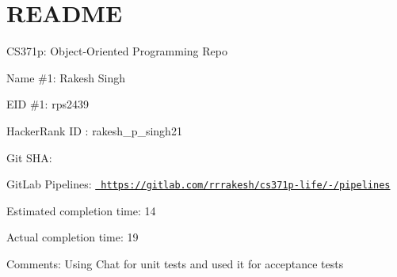 \chapter{README}
\hypertarget{md_README}{}\label{md_README}
CS371p\+: Object-\/\+Oriented Programming  Repo

Name \#1\+: Rakesh Singh

EID \#1\+: rps2439

Hacker\+Rank ID \+: rakesh\+\_\+p\+\_\+singh21

Git SHA\+:

Git\+Lab Pipelines\+: \href{https://gitlab.com/rrrakesh/cs371p-life/-/pipelines}{\texttt{ https\+://gitlab.\+com/rrrakesh/cs371p-\/life/-\//pipelines}}

Estimated completion time\+: 14

Actual completion time\+: 19

Comments\+: Using Chat for unit tests and used it for acceptance tests 